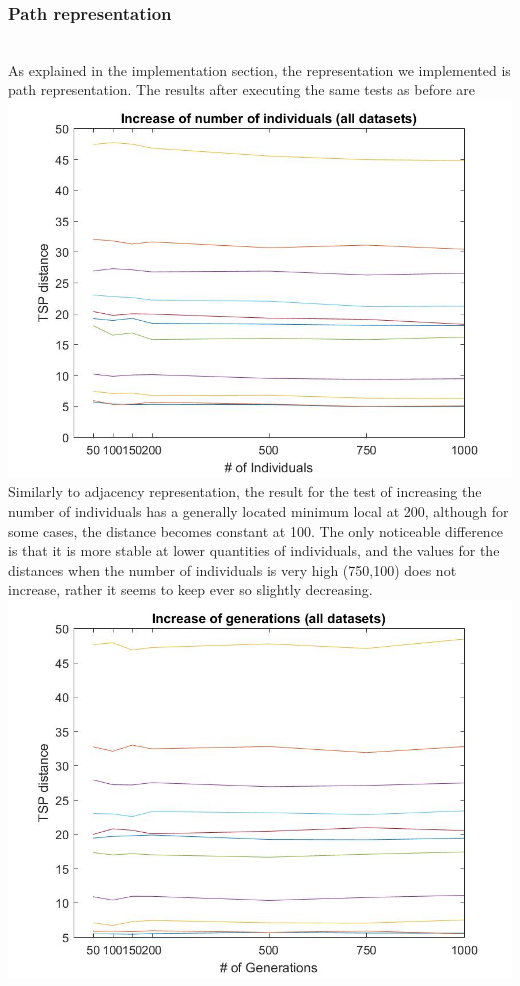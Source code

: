 \subsubsection{Path representation}\\
As explained in the implementation section, the representation we
implemented is path representation. The results after executing the same
tests as before are\\
\includegraphics[width=\textwidth]{img/order_crossover/numberIndiv.jpg}\\
Similarly to adjacency representation, the result for the test
of increasing the number of individuals has a generally located minimum local at
200, although for some cases, the distance becomes constant at 100. The only
noticeable difference is that it is more stable at lower quantities of
individuals, and the values for the distances when the number of
individuals is very high (750,100) does not increase, rather it seems to keep
ever so slightly decreasing. \\
\includegraphics[width=\textwidth]{img/order_crossover/numberGens.jpg}\\
